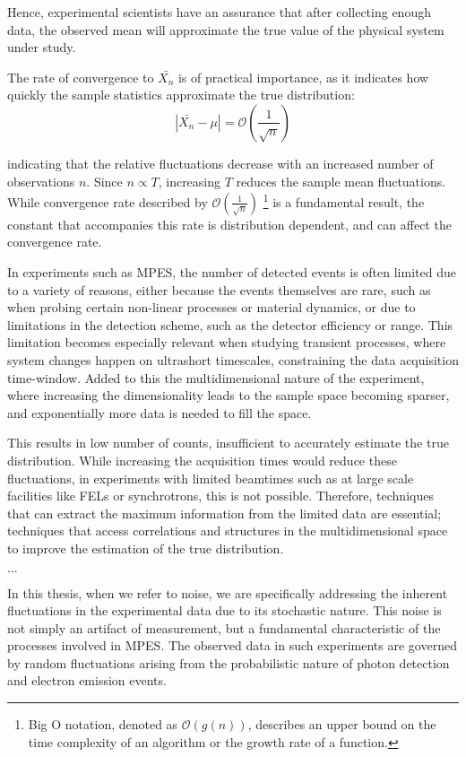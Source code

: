 Hence, experimental scientists have an assurance that after collecting enough data, the observed mean will approximate the true value of the physical system under study.

The rate of convergence to $\bar{X_n}$ is of practical importance, as it indicates how quickly the sample statistics approximate the true distribution:
\begin{equation}
    \left|\bar{X_n} - \mu\right| = \mathcal{O}\left(\frac{1}{\sqrt{n}}\right)
\end{equation}

indicating that the relative fluctuations decrease with an increased number of observations $n$.  Since $n \propto T$, increasing $T$ reduces the sample mean fluctuations. While convergence rate described by $\mathcal{O}\left(\frac{1}{\sqrt{n}}\right)$
\footnote{Big O notation, denoted as $\mathcal{O}(g(n))$, describes an upper bound on the time complexity of an algorithm or the growth rate of a function.} is a fundamental result, the constant that accompanies this rate is distribution dependent, and can affect the convergence rate.

In experiments such as \gls{MPES}, the number of detected events is often limited due to a variety of reasons, either because the events themselves are rare, such as when probing certain non-linear processes or material dynamics, or due to limitations in the detection scheme, such as the detector efficiency or range. This limitation becomes especially relevant when studying transient processes, where system changes happen on ultrashort timescales, constraining the data acquisition time-window.  Added to this the multidimensional nature of the experiment, where increasing the dimensionality leads to the sample space becoming sparser, and exponentially more data is needed to fill the space.

This results in low number of counts, insufficient to accurately estimate the true distribution. While increasing the acquisition times would reduce these fluctuations, in experiments with limited \glspl{beamtime} such as at large scale facilities like \glspl{FEL} or synchrotrons, this is not possible. Therefore, techniques that can extract the maximum information from the limited data are essential; techniques that access correlations and structures in the multidimensional space to improve the estimation of the true distribution.

$\dots$

In this thesis, when we refer to noise, we are specifically addressing the inherent fluctuations in the experimental data due to its stochastic nature. This noise is not simply an artifact of measurement, but a fundamental characteristic of the processes involved in \gls{MPES}. The observed data in such experiments are governed by random fluctuations arising from the probabilistic nature of photon detection and electron emission events.

